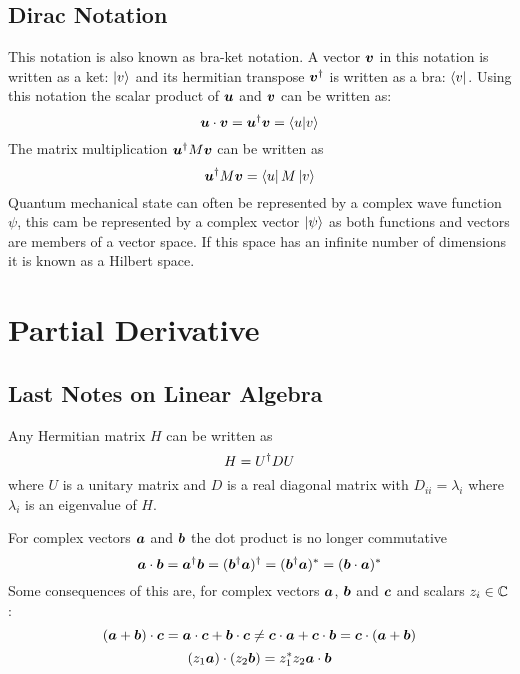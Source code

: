 \documentclass{article}
\begin{document}
    \subsection{Dirac Notation}
    This notation is also known as bra-ket notation. 
    A vector \(\bm{v}\) in this notation is written as a ket: \(\ket v\) and its hermitian transpose \(\bm{v}^\dagger\) is written as a bra: \(\bra v\).
    Using this notation the scalar product of \(\bm{u}\) and \(\bm{v}\) can be written as:
    \[\bm{u}\cdot \bm{v} = \bm{u}^\dagger\bm{v} = \braket{u}{v}\]
    The matrix multiplication \(\bm{u}^\dagger M\bm{v}\) can be written as
    \[\bm{u}^\dagger M \bm{v} = \bra{u}M\ket{v}\]
    Quantum mechanical state can often be represented by a complex wave function \(\psi\), this cam be represented by a complex vector \(\ket{\psi}\) as both functions and vectors are members of a vector space.
    If this space has an infinite number of dimensions it is known as a Hilbert space.
    
    \section{Partial Derivative}
    \subsection{Last Notes on Linear Algebra}
    Any Hermitian matrix \(H\) can be written as
    \[H = U^\dagger DU\]
    where \(U\) is a unitary matrix and \(D\) is a real diagonal matrix with \(D_{ii} = \lambda_i\) where \(\lambda_i\) is an eigenvalue of \(H\).
    
    For complex vectors \(\bm{a}\) and \(\bm{b}\) the dot product is no longer commutative
    \[\bm{a}\cdot \bm{b} = \bm{a}^\dagger\bm{b} = (\bm{b}^\dagger\bm{a})^\dagger = (\bm{b}^\dagger\bm{a})^* = (\bm{b}\cdot\bm{a})^*\]
    Some consequences of this are, for complex vectors \(\bm{a}\), \(\bm{b}\) and \(\bm{c}\) and scalars \(z_i\in\mathbb{C}\):
    \[(\bm{a} + \bm{b})\cdot\bm{c} = \bm{a}\cdot \bm{c} + \bm{b}\cdot \bm{c} \ne \bm{c}\cdot \bm{a} + \bm{c}\cdot \bm{b} = \bm{c}\cdot(\bm{a} + \bm{b})\]
    \[(z_1\bm{a})\cdot(z_2\bm{b}) = z_1^*z_2\bm{a}\cdot\bm{b}\]
    
\end{document}

